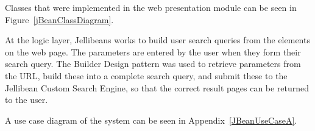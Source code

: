 \documentclass[a4paper, 11pt]{article}
\begin{document}
Classes that were implemented in the web presentation module can be seen in Figure~\ref{jBeanClassDiagram}.

\vspace{5mm}

At the logic layer, Jellibeans works to build user search queries from the elements on the web page. The parameters are entered by the user when they form their search query. The Builder Design pattern was used to retrieve parameters from the URL, build these into a complete search query, and submit these to the Jellibean Custom Search Engine, so that the correct result pages can be returned to the user. 

\vspace{5mm}


A use case diagram of the system can be seen in Appendix~\ref{JBeanUseCaseA}.

\end{document}
